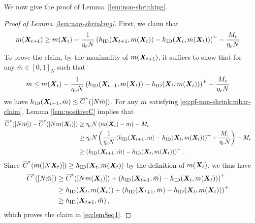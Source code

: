 We now give the proof of Lemma~\ref{lem:non-shrinking}.
\begin{proof}[Proof of Lemma~\ref{lem:non-shrinking}]
    First, we claim that 
    \begin{align}\label{eq:lem8eq1}
        m({\bm{X}}_{t+1})\geq m({\bm{X}}_t) - \frac{1}{\eta_c N} \left(h_{\textnormal{ID}}({\bm{X}}_{t+1},m({\bm{X}}_{t}))-h_{\textnormal{ID}}({\bm{X}}_t,m({\bm{X}}_t))\right)^+ - \frac{M_c}{\eta_cN}
    \end{align}
    To prove the claim, by the maximality of $m({\bm{X}}_{t+1})$, it suffices to show that for any $\bar{m}\in [0,1]_N$ such that 
    \begin{equation}
        \label{eq:pf-non-shrink:mbar-claim}
        \Bar{m}\leq m({\bm{X}}_t) - \frac{1}{\eta_cN} \left(h_{\textnormal{ID}}({\bm{X}}_{t+1},m({\bm{X}}_t))-h_{\textnormal{ID}}({\bm{X}}_t,m({\bm{X}}_t))\right)^+ -\frac{M_c}{\eta_cN}
    \end{equation}
    we have $h_{\textnormal{ID}}({\bm{X}}_{t+1},\Bar{m})\leq \overline{C}^*([N\Bar{m}])$.
    For any $\Bar{m}$ satisfying \eqref{eq:pf-non-shrink:mbar-claim}, Lemma \ref{lem:positiveC} implies that
    \begin{align*}
        \overline{C}^*([N\Bar{m}])-\overline{C}^*([Nm({\bm{X}}_t)])
        &\geq \eta_c N \left(m({\bm{X}}_t) - \bar{m}\right) - M_c  \\
        &\geq\eta_c N\left(\frac{1}{\eta_c N}\left(h_{\textnormal{ID}}({\bm{X}}_{t+1},\Bar{m})-h_{\textnormal{ID}}({\bm{X}}_t,m({\bm{X}}_t))\right)^++\frac{M_c}{\eta_cN} \right) - M_c\\
        &\geq\left(h_{\textnormal{ID}}({\bm{X}}_{t+1},\Bar{m})-h_{\textnormal{ID}}({\bm{X}}_t,m({\bm{X}}_t))\right)^+ \,.
    \end{align*}
    Since $\overline{C}^*(m([N{\bm{X}}_t)])\geq h_{\textnormal{ID}}({\bm{X}}_t,m({\bm{X}}_t))$ by the definition of $m({\bm{X}}_t)$, we thus have
    \begin{align*}
        \overline{C}^*([N\Bar{m}])&\geq \overline{C}^*([Nm({\bm{X}}_t)]) + \left(h_{\textnormal{ID}}({\bm{X}}_{t+1},\Bar{m})-h_{\textnormal{ID}}({\bm{X}}_t,m({\bm{X}}_t))\right)^+ \\
        &\geq h_{\textnormal{ID}}({\bm{X}}_t,m({\bm{X}}_t)) + \left(h_{\textnormal{ID}}({\bm{X}}_{t+1},\Bar{m})-h_{\textnormal{ID}}({\bm{X}}_t,m({\bm{X}}_t))\right)^+ \\
        &\geq h_{\textnormal{ID}}({\bm{X}}_{t+1},\Bar{m})\,,
    \end{align*}
    which proves the claim in \eqref{eq:lem8eq1}. 


\end{proof}
